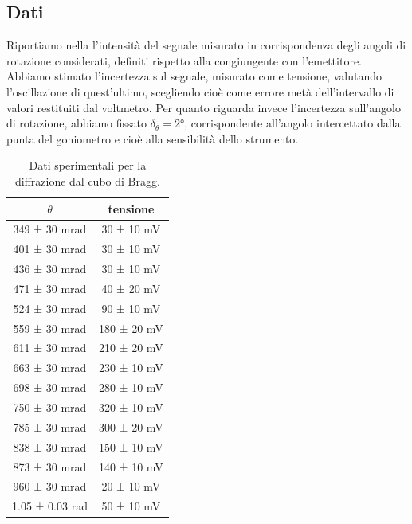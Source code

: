 \documentclass[a4paper]{article}
\begin{document}
\subsection{Dati}
Riportiamo nella  l'intensità del segnale misurato in corrispondenza degli angoli di rotazione considerati, definiti rispetto 
alla congiungente con l'emettitore.
Abbiamo stimato l'incertezza sul segnale, misurato come tensione, valutando l'oscillazione di quest'ultimo, scegliendo cioè come errore metà dell'intervallo di valori restituiti dal voltmetro. Per quanto riguarda invece l'incertezza sull'angolo di rotazione, abbiamo fissato $\delta_{\theta}=\ang{2}$, corrispondente all'angolo intercettato dalla punta del goniometro e cioè alla sensibilità dello strumento.

\begin{table}[htbp]
\centering
\begin{tabular}{|c|c|}
\hline
$\theta$ & tensione \\\hline\hline
349 ± 30 mrad & 30 ± 10 mV \\
401 ± 30 mrad & 30 ± 10 mV \\
436 ± 30 mrad & 30 ± 10 mV \\
471 ± 30 mrad & 40 ± 20 mV \\
524 ± 30 mrad & 90 ± 10 mV \\
559 ± 30 mrad & 180 ± 20 mV \\
611 ± 30 mrad & 210 ± 20 mV \\
663 ± 30 mrad & 230 ± 10 mV \\
698 ± 30 mrad & 280 ± 10 mV \\
750 ± 30 mrad & 320 ± 10 mV \\
785 ± 30 mrad & 300 ± 20 mV \\
838 ± 30 mrad & 150 ± 10 mV \\
873 ± 30 mrad & 140 ± 10 mV \\
960 ± 30 mrad & 20 ± 10 mV \\
1.05 ± 0.03 rad & 50 ± 10 mV \\
\hline
\end{tabular}
\caption{Dati sperimentali per la diffrazione dal cubo di Bragg.}
\label{tab:dati_bragg}
\end{table}
\end{document}
